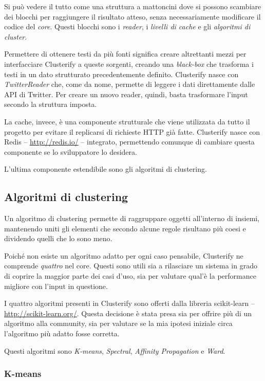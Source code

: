 	Si può vedere il tutto come una struttura a mattoncini dove si possono scambiare dei blocchi per raggiungere il risultato atteso, senza necessariamente modificare il codice del \emph{core}. Questi blocchi sono i \emph{reader}, i \emph{livelli di cache} e gli \emph{algoritmi di cluster}.
	
	Permettere di ottenere testi da più fonti significa creare altrettanti mezzi per interfacciare Clusterify a queste sorgenti, creando una \emph{black-box} che trasforma i testi in un dato strutturato precedentemente definito. Clusterify nasce con \emph{TwitterReader} che, come da nome, permette di leggere i dati direttamente dalle API di Twitter. Per creare un nuovo reader, quindi, basta trasformare l'input secondo la struttura imposta.

	La cache, invece, è una componente strutturale che viene utilizzata da tutto il progetto per evitare il replicarsi di richieste HTTP già fatte. Clusterify nasce con Redis -- \url{http://redis.io/} -- integrato, permettendo comunque di cambiare questa componente se lo sviluppatore lo desidera.

	L'ultima componente estendibile sono gli algoritmi di clustering.

	\subsection{Algoritmi di clustering}
		Un algoritmo di clustering permette di raggruppare oggetti all'interno di insiemi, mantenendo uniti gli elementi che secondo alcune regole risultano più coesi e dividendo quelli che lo sono meno.

		Poiché non esiste un algoritmo adatto per ogni caso pensabile, Clusterify ne comprende \emph{quattro} nel core. Questi sono utili sia a rilasciare un sistema in grado di coprire la maggior parte dei casi d'uso, sia per valutare qual'è la performance migliore con l'input in questione.

		I quattro algoritmi presenti in Clusterify sono offerti dalla libreria scikit-learn -- \url{http://scikit-learn.org/}. Questa decisione è stata presa sia per offrire più di un algoritmo alla community, sia per valutare se la mia ipotesi iniziale circa l'algoritmo più adatto fosse corretta. 

		Questi algoritmi sono \emph{K-means}, \emph{Spectral}, \emph{Affinity Propagation} e \emph{Ward}.

		\subsubsection{K-means}
			

